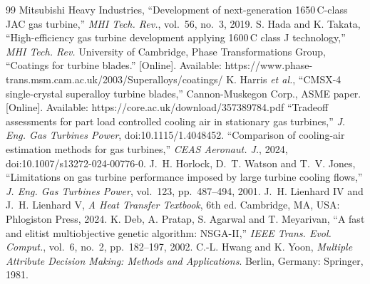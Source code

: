 \documentclass[10pt,a4paper,twocolumn]{article}
\begin{document}
\begin{thebibliography}{99}
 Mitsubishi Heavy Industries, ``Development of next-generation 1650\,\textdegree C-class JAC gas turbine,'' \emph{MHI Tech. Rev.}, vol.~56, no.~3, 2019.
 S. Hada and K. Takata, ``High-efficiency gas turbine development applying 1600\,\textdegree C class J technology,'' \emph{MHI Tech. Rev.}
 University of Cambridge, Phase Transformations Group, ``Coatings for turbine blades.'' [Online]. Available: https://www.phase-trans.msm.cam.ac.uk/2003/Superalloys/coatings/
 K. Harris \emph{et al.}, ``CMSX-4 single-crystal superalloy turbine blades,'' Cannon-Muskegon Corp., ASME paper. [Online]. Available: https://core.ac.uk/download/357389784.pdf
 ``Tradeoff assessments for part load controlled cooling air in stationary gas turbines,'' \emph{J. Eng. Gas Turbines Power}, doi:10.1115/1.4048452.
 ``Comparison of cooling-air estimation methods for gas turbines,'' \emph{CEAS Aeronaut. J.}, 2024, doi:10.1007/s13272-024-00776-0.
 J.~H. Horlock, D.~T. Watson and T.~V. Jones, ``Limitations on gas turbine performance imposed by large turbine cooling flows,'' \emph{J. Eng. Gas Turbines Power}, vol.~123, pp.~487--494, 2001.
 J.~H. Lienhard IV and J.~H. Lienhard V, \emph{A Heat Transfer Textbook}, 6th ed. Cambridge, MA, USA: Phlogiston Press, 2024.
 K. Deb, A. Pratap, S. Agarwal and T. Meyarivan, ``A fast and elitist multiobjective genetic algorithm: NSGA-II,'' \emph{IEEE Trans. Evol. Comput.}, vol.~6, no.~2, pp.~182--197, 2002.
 C.-L. Hwang and K. Yoon, \emph{Multiple Attribute Decision Making: Methods and Applications}. Berlin, Germany: Springer, 1981.
\end{thebibliography}
\normalsize

\appendix
\end{document}
